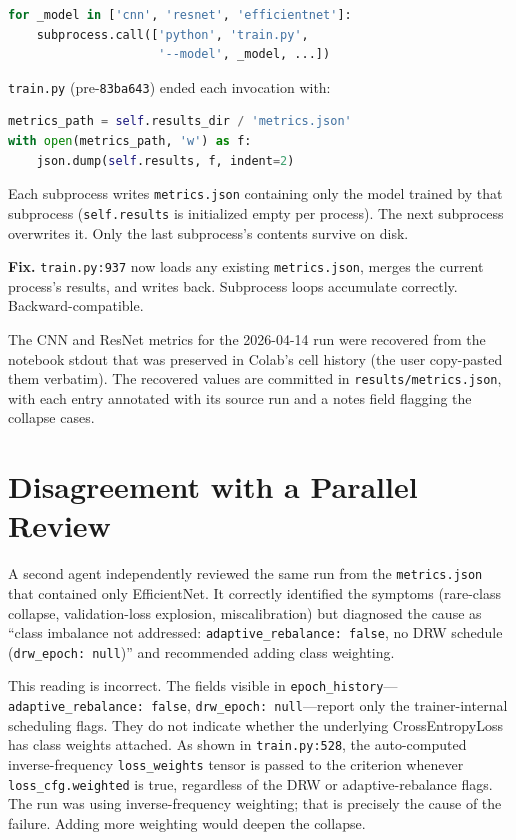 \documentclass[conference]{IEEEtran}
\begin{document}
\begin{lstlisting}[language=Python]
for _model in ['cnn', 'resnet', 'efficientnet']:
    subprocess.call(['python', 'train.py',
                     '--model', _model, ...])
\end{lstlisting}

\texttt{train.py} (pre-\texttt{83ba643}) ended each invocation with:

\begin{lstlisting}[language=Python]
metrics_path = self.results_dir / 'metrics.json'
with open(metrics_path, 'w') as f:
    json.dump(self.results, f, indent=2)
\end{lstlisting}

Each subprocess writes \texttt{metrics.json} containing only the model
trained by that subprocess (\texttt{self.results} is initialized empty
per process). The next subprocess overwrites it. Only the last
subprocess's contents survive on disk.

\textbf{Fix.} \texttt{train.py:937} now loads any existing
\texttt{metrics.json}, merges the current process's results, and writes
back. Subprocess loops accumulate correctly. Backward-compatible.

The CNN and ResNet metrics for the 2026-04-14 run were recovered from the
notebook stdout that was preserved in Colab's cell history (the user
copy-pasted them verbatim). The recovered values are committed in
\texttt{results/metrics.json}, with each entry annotated with its source
run and a notes field flagging the collapse cases.

\section{Disagreement with a Parallel Review}

A second agent independently reviewed the same run from the
\texttt{metrics.json} that contained only EfficientNet. It correctly
identified the symptoms (rare-class collapse, validation-loss explosion,
miscalibration) but diagnosed the cause as ``class imbalance not
addressed: \texttt{adaptive\_rebalance: false}, no DRW schedule
(\texttt{drw\_epoch: null})'' and recommended adding class weighting.

This reading is incorrect. The fields visible in
\texttt{epoch\_history}---\texttt{adaptive\_rebalance: false},
\texttt{drw\_epoch: null}---report only the trainer-internal scheduling
flags. They do not indicate whether the underlying CrossEntropyLoss has
class weights attached. As shown in \texttt{train.py:528}, the
auto-computed inverse-frequency \texttt{loss\_weights} tensor is passed to
the criterion whenever \texttt{loss\_cfg.weighted} is true, regardless of
the DRW or adaptive-rebalance flags. The run was using inverse-frequency
weighting; that is precisely the cause of the failure. Adding more
weighting would deepen the collapse.
\end{document}

